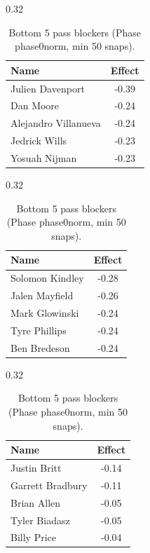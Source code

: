 \begin{table}[h!]
\centering
\begin{subtable}{0.32\textwidth}
\centering
\footnotesize
\begin{tabular}{lc}
\toprule
Name & Effect \\
\midrule
Julien Davenport & -0.39 \\
Dan Moore & -0.24 \\
Alejandro Villanueva & -0.24 \\
Jedrick Wills & -0.23 \\
Yosuah Nijman & -0.23 \\
\bottomrule
\end{tabular}
\caption{T}
\end{subtable}
\hfill
\begin{subtable}{0.32\textwidth}
\centering
\footnotesize
\begin{tabular}{lc}
\toprule
Name & Effect \\
\midrule
Solomon Kindley & -0.28 \\
Jalen Mayfield & -0.26 \\
Mark Glowinski & -0.24 \\
Tyre Phillips & -0.24 \\
Ben Bredeson & -0.24 \\
\bottomrule
\end{tabular}
\caption{G}
\end{subtable}
\hfill
\begin{subtable}{0.32\textwidth}
\centering
\footnotesize
\begin{tabular}{lc}
\toprule
Name & Effect \\
\midrule
Justin Britt & -0.14 \\
Garrett Bradbury & -0.11 \\
Brian Allen & -0.05 \\
Tyler Biadasz & -0.05 \\
Billy Price & -0.04 \\
\bottomrule
\end{tabular}
\caption{C}
\end{subtable}
\caption{Bottom 5 pass blockers (Phase phase0norm, min 50 snaps).}
\label{tab:blocker_pm_phase0norm_bot}
\end{table}
